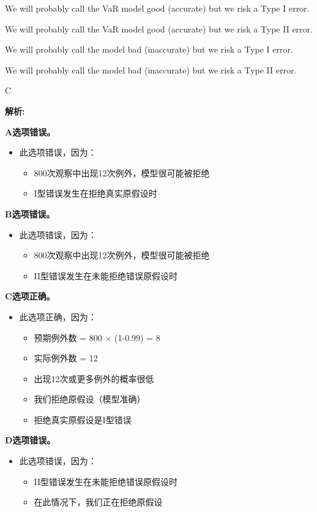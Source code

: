 \documentclass{article}
\newenvironment{explanation}
{\textbf{解析:}\par}
{\par}
\begin{document}
\begin{choices}
    \item We will probably call the VaR model good (accurate) but we risk a Type I error.
    \item We will probably call the VaR model good (accurate) but we risk a Type II error.
    \item We will probably call the model bad (inaccurate) but we risk a Type I error.
    \item We will probably call the model bad (inaccurate) but we risk a Type II error.
\end{choices}

\begin{correctanswer}
    C
\end{correctanswer}

\begin{explanation}
    \textbf{A选项错误。}
    \begin{itemize}
        \item 此选项错误，因为：
        \begin{itemize}
            \item 800次观察中出现12次例外，模型很可能被拒绝
            \item I型错误发生在拒绝真实原假设时
        \end{itemize}
    \end{itemize}
    \textbf{B选项错误。}
    \begin{itemize}
        \item 此选项错误，因为：
        \begin{itemize}
            \item 800次观察中出现12次例外，模型很可能被拒绝
            \item II型错误发生在未能拒绝错误原假设时
        \end{itemize}
    \end{itemize}
    \textbf{C选项正确。}
    \begin{itemize}
        \item 此选项正确，因为：
        \begin{itemize}
            \item 预期例外数 = 800 × (1-0.99) = 8
            \item 实际例外数 = 12
            \item 出现12次或更多例外的概率很低
            \item 我们拒绝原假设（模型准确）
            \item 拒绝真实原假设是I型错误
        \end{itemize}
    \end{itemize}
    \textbf{D选项错误。}
    \begin{itemize}
        \item 此选项错误，因为：
        \begin{itemize}
            \item II型错误发生在未能拒绝错误原假设时
            \item 在此情况下，我们正在拒绝原假设
        \end{itemize}
    \end{itemize}
\end{explanation}
\end{document}
